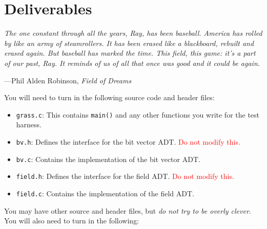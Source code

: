 \documentclass[11pt]{article}
\begin{document}
\section{Deliverables}

\epigraph{\emph{The one constant through all the years, Ray, has been baseball. America has rolled by like an army of steamrollers. It has been erased like a blackboard, rebuilt and erased again. But baseball has marked the time. This field, this game: it's a part of our past, Ray. It reminds of us of all that once was good and it could be again.}}{---Phil Alden Robinson, \emph{Field of Dreams}}

\noindent
You will need to turn in the following source code and header files:

\begin{itemize}
    \item \texttt{grass.c}: This contains \texttt{main()} and any other functions you write for the test harness.
    \item \texttt{bv.h}: Defines the interface for the bit vector ADT. \textcolor{red}{Do not modify this.}
    \item \texttt{bv.c}: Contains the implementation of the bit vector ADT.
    \item \texttt{field.h}: Defines the interface for the field ADT. \textcolor{red}{Do not modify this.}
    \item \texttt{field.c}: Contains the implementation of the field ADT.
\end{itemize}

You may have other source and header files, but \emph{do not try to be overly clever}. You will also need to turn in the following:
\end{document}

